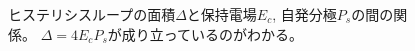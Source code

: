 \documentclass[11pt,dvipdfmx,a4paper]{jsarticle}
\begin{document}
\begin{figure}[H]
\begin{minipage}[t]{0.48\columnwidth}
        \caption{\small{ヒステリシスループの面積\(\Delta\)と保持電場\(E_c\), 自発分極\(P_s\)の間の関係。
        \(\Delta=4E_cP_s\)が成り立っているのがわかる。}}
        \label{graph:TGS_Delta-E}
    \end{minipage}
\end{figure}

\end{document}
